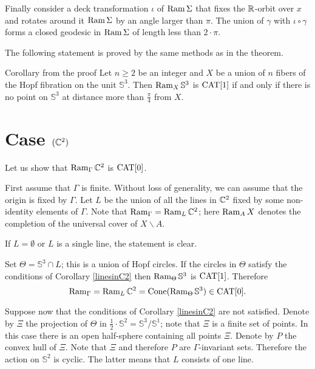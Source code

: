 \documentclass[oneside,a4paper]{article}
\begin{document}
Finally consider a deck transformation
$\iota$ of $\mathop{\rm Ram}\nolimits \Sigma$ that fixes  the $\mathbb{R}$-orbit over $x$
and rotates around it $\mathop{\rm Ram}\nolimits \Sigma$ by an angle larger than $\pi$.
The union of $\gamma$ with $\iota\circ\gamma$ forms a closed geodesic in
$\mathop{\rm Ram}\nolimits \Sigma$ of length less than $2{\cdot}\pi$.
\qeds

The following statement is proved by the same methods as in the theorem.

\begin{thm}{Corollary from the proof}\label{linesinC2} Let $n\ge 2$ be an integer
and $X$ be a union of $n$ fibers
 of the Hopf fibration on  the unit $\mathbb{S}^3$.
Then $\mathop{\rm Ram}\nolimits_{X}\mathbb{S}^3$ is $\mathrm{CAT}[1]$ if and only if there is no point on $\mathbb{S}^3$ at distance more than $\frac{\pi}{4}$ from $X$.
\end{thm}





\section{Case $(\mathbb{C}^2)$} \label{pkspaces}

Let us show that $\mathop{\rm Ram}\nolimits_{\Gamma}\mathbb{C}^2$ is $\mathrm{CAT}[0]$.

First assume that $\Gamma$ is finite.
Without loss of generality, we can assume that the origin is fixed by $\Gamma$.
Let $L$ be the union of all the lines in $\mathbb{C}^2$
fixed by some non-identity elements of $\Gamma$.
Note that $\mathop{\rm Ram}\nolimits_{\Gamma}=\mathop{\rm Ram}\nolimits_{L}\mathbb{C}^2$;
here $\mathop{\rm Ram}\nolimits_AX$ denotes the completion of the universal cover of $X\backslash A$.

If $L=\emptyset$
or $L$ is a single line,
the statement is clear.

Set $\Theta=\mathbb{S}^3\cap L$; this
is a union of Hopf circles.
If the circles in $\Theta$
satisfy the conditions of
Corollary \ref{linesinC2} then $\mathop{\rm Ram}\nolimits_{\Theta} \mathbb{S}^3$ is $\mathrm{CAT}[1]$.
Therefore
\[\mathop{\rm Ram}\nolimits_\Gamma=\mathop{\rm Ram}\nolimits_L\mathbb{C}^2=\mathop{\rm Cone}\nolimits(\mathop{\rm Ram}\nolimits_{\Theta} \mathbb{S}^3)\in \mathrm{CAT}[0].\]


Suppose now that the conditions of
Corollary \ref{linesinC2} are not satisfied.
Denote by $\Xi$ the projection of $\Theta$ in $\tfrac12\cdot\mathbb{S}^2=\mathbb{S}^3/\mathbb{S}^1$;
note that $\Xi$ is a finite set of points.
In this case there is an open half-sphere containing all points $\Xi$.
Denote by $P$ the convex hull of $\Xi$.
Note that $\Xi$ and therefore $P$ are $\Gamma$-invariant sets.
Therefore the action on $\mathbb{S}^2$ is cyclic.
The latter means that $L$ consists of one line.
\end{document}
